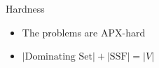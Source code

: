 \begin{frame}[<+->]{Hardness}
\begin{itemize}
  \item The problems are APX-hard
  \item $|\text{Dominating Set}| + |\text{SSF}| = |V|$
\end{itemize}
\onslide<+>
\begin{center}

\end{center}
\end{frame}